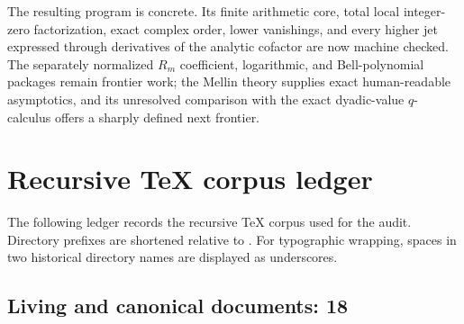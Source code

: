 \documentclass[11pt,oneside]{article}
\numberwithin{equation}{section}
\theoremstyle{plain}
\theoremstyle{definition}
\theoremstyle{remark}
\begin{document}
The resulting program is concrete.  Its finite arithmetic core, total local
integer-zero factorization, exact complex order, lower vanishings, and every
higher jet expressed through derivatives of the analytic cofactor are now
machine checked.  The separately normalized \(R_m\) coefficient, logarithmic,
and Bell-polynomial packages remain frontier work; the
Mellin theory supplies exact human-readable asymptotics, and its unresolved
comparison with the exact dyadic-value $q$-calculus offers a sharply defined
next frontier.

\appendix
\clearpage
\begingroup
\small
\setlength{\tabcolsep}{5pt}
\sloppy
\section{Recursive TeX corpus ledger}\label{app:ledger}

The following ledger records the recursive TeX corpus used for the audit.  Directory prefixes are shortened relative to
.  For typographic wrapping, spaces in two historical directory names are displayed as underscores.

\subsection{Living and canonical documents: 18}
\end{document}
